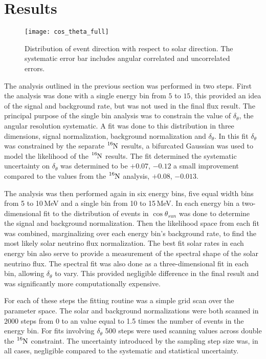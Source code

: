 \section{Results}
\begin{figure}
  \centering
  \texttt{[image: cos\_theta\_full]}
  \caption[5.0 to 15.0 MeV $\cos\theta_{sun}$ Distribution] {Distribution of event direction
                                              with respect to solar direction.
                                              The systematic error bar includes
                                              angular correlated and
                                              uncorrelated errors.}

  \label{fig:costheta}
\end{figure}
The analysis outlined in the previous section was performed in two steps.
First the analysis was done with a single energy bin from $5$ to $15$,
this provided an idea of the signal and background rate, but was not used in
the final flux result.
The principal purpose of the single bin analysis was to constrain the value of
$\delta_{\theta}$, the angular resolution systematic.
A fit was done to this distribution in three dimensions, signal normalization,
background normalization and $\delta_{\theta}$.
In this fit $\delta_{\theta}$ was constrained by the separate $\ce{^{16}N}$ 
results, a bifurcated Gaussian was used to model the likelihood of the
$\ce{^{16}N}$ results.
The fit determined the systematic uncertainty on $\delta_{\theta}$
was determined to be $+0.07$, $-0.12$ a small improvement  compared to the values from the 
$\ce{^{16}N}$ analysis, $+0.08$, $-0.013$.

The analysis was then performed again in six energy bins, five equal width
bins from 5 to 10\,MeV and a single bin from 10 to 15\,MeV.
In each energy bin a two-dimensional fit to the distribution of events in $\cos\theta_{sun}$ was
done to determine the signal and background normalization.
Then the likelihood space from each fit was combined,
marginalizing over each energy bin's background rate,
to find the most likely solar neutrino flux normalization.
The best fit solar rates in each energy bin also serve to provide
a measurement of the spectral shape of the solar neutrino
flux.
The spectral fit was also done as a three-dimensional fit
in each bin, allowing $\delta_{\theta}$ to vary.
This provided negligible difference in the final result
and was significantly more computationally expensive.

For each of these steps the fitting routine was a simple grid scan
over the parameter space. 
The solar and background normalizations were both scanned in $2000$ steps from 0 to
an  value equal to  1.5 times the number of events in the energy bin.
For fits involving $\delta_{\theta}$ 500 steps were used scanning values across
double the $\ce{^{16}N}$ constraint.
The uncertainty introduced by the sampling step size was, in all cases, negligible
compared to the systematic and statistical uncertainty.

